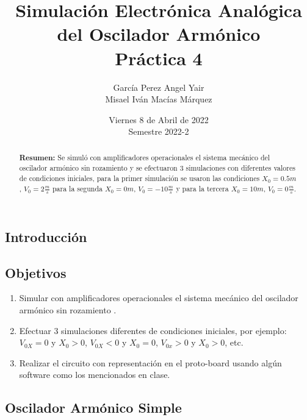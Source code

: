 \documentclass[DIV=calc, paper=a4, fontsize=11pt]{scrartcl}
\title{Simulación Electrónica Analógica del Oscilador Armónico\\ %
Práctica 4} %
\author{García Perez Angel Yair\\
Misael Iván Macías Márquez}
\date{Viernes 8 de Abril de 2022\\Semestre 2022-2}
\begin{document}
\maketitle


\begin{abstract}
\textbf{Resumen:} Se simuló con amplificadores operacionales el sistema mecánico del oscilador armónico sin rozamiento y se efectuaron $3$ simulaciones con diferentes valores de condiciones iniciales, para la primer simulación se usaron las condiciones $X_{0}=0.5 m$, $V_{0}= 2\frac{m}{s}$ para la segunda $X_{0}=0 m$, $V_{0}= -10\frac{m}{s}$ y para la tercera $X_{0}=10 m$, $V_{0}= 0\frac{m}{s}$.
\end{abstract}

\begin{multicols}{2}




\section*{Introducción}

\subsection*{Objetivos}

\begin{enumerate}
    \item Simular con amplificadores operacionales el sistema mecánico del oscilador armónico sin rozamiento .
    
    \item Efectuar 3 simulaciones diferentes de condiciones iniciales, por ejemplo: $V_{0X} = 0$ y $X_0 > 0$, $V_{0X}<0$ y $X_0 =0$, $V_{0x}> 0$ y $X_{0}>0$, etc.
    
    \item Realizar el circuito con representación en el proto-board usando algún software como los mencionados en clase.
\end{enumerate}

\subsection*{Oscilador Armónico Simple}


\end{multicols}
\end{document}
